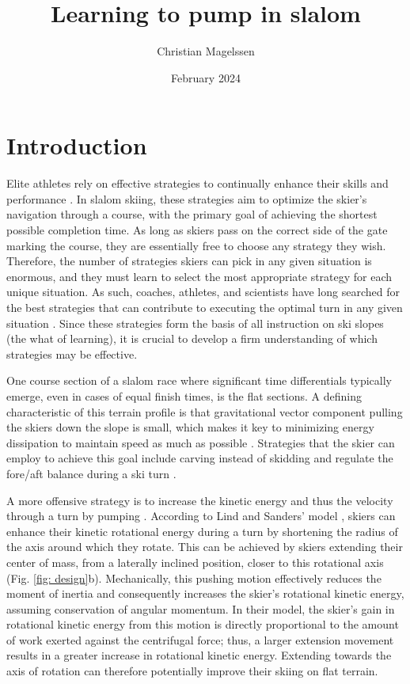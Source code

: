 \documentclass{article}
\title{Learning to pump in slalom}
\author{Christian Magelssen}
\date{February 2024}
\begin{document}
\section{Introduction}
Elite athletes rely on effective strategies to continually enhance their skills and performance \cite{krakauer_motor_2019, taylor_role_2012, gray_plateaus_2017, tsay_strategy_2023}. In slalom skiing, these strategies aim to optimize the skier's navigation through a course, with the primary goal of achieving the shortest possible completion time. As long as skiers pass on the correct side of the gate marking the course, they are essentially free to choose any strategy they wish. Therefore, the number of strategies skiers can pick in any given situation is enormous, and they must learn to select the most appropriate strategy for each unique situation\cite{tsay_strategy_2023}. As such, coaches, athletes, and scientists have long searched for the best strategies that can contribute to executing the optimal turn in any given situation \cite{lemaster_skiers_1999, lemaster_ultimate_2010, reid_kinematic_2010, joubert_how_1967, joubert_ski_1978, luginbuhl_identification_2023, lind_physics_2013}. Since these strategies form the basis of all instruction on ski slopes (the what of learning), it is crucial to develop a firm understanding of which strategies may be effective. 

One course section of a slalom race where significant time differentials typically emerge, even in cases of equal finish times, is the flat sections\cite{supej_new_2011}. A defining characteristic of this terrain profile is that gravitational vector component pulling the skiers down the slope is small\cite{howe_new_2001}, which makes it key to  minimizing energy dissipation to maintain speed as much as possible \cite{supej_differential_2008}. Strategies that the skier can employ to achieve this goal include carving instead of skidding and regulate the fore/aft balance during a ski turn \cite{reid_turn_2009, reid_kinematic_2010}. 

A more offensive strategy is to increase the kinetic energy and thus the velocity through a turn by pumping \cite{lind_physics_2013}. According to Lind and Sanders' model \cite{lind_physics_2013}, skiers can enhance their kinetic rotational energy during a turn by shortening the radius of the axis around which they rotate. This can be achieved by skiers extending their center of mass, from a laterally inclined position, closer to this rotational axis (Fig. \ref{fig: design}b). Mechanically, this pushing motion effectively reduces the moment of inertia and consequently increases the skier's rotational kinetic energy, assuming conservation of angular momentum. In their model, the skier's gain in rotational kinetic energy from this motion is directly proportional to the amount of work exerted against the centrifugal force; thus, a larger extension movement results in a greater increase in rotational kinetic energy. Extending towards the axis of rotation can therefore potentially improve their skiing on flat terrain. 
\end{document}
